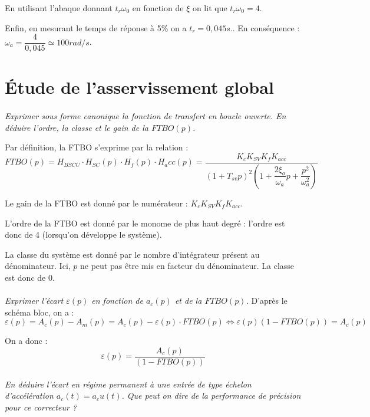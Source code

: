 \documentclass[10pt,oneside]{article}
\begin{document}
En utilisant l'abaque donnant $t_r \omega_0$ en fonction de $\xi$ on lit que 
$t_r \omega_0 = 4$. 

Enfin, en mesurant le temps de réponse à 5\% on a $t_r = 0,045 s.$. En
conséquence : $\omega_a = \dfrac{4}{0,045}\simeq 100 rad/s$.

\section{Étude de l'asservissement global}

\paragraph{}
\textit{Exprimer sous forme canonique la fonction de transfert en boucle ouverte. En déduire
l’ordre, la classe et le gain de la $FTBO(p)$.}

Par définition, la FTBO s'exprime par la relation :
$$
FTBO(p)=H_{BSCU} \cdot H_{SC}(p) \cdot H_f(p) \cdot H_acc(p) =
\dfrac{K_cK_{SV}K_fK_{acc}}{\left( 1+T_{sv}p
\right)^2\left(1+\dfrac{2\xi_a}{\omega_a}p+\dfrac{p^2}{\omega_a^2}\right)}
$$

Le gain de la FTBO est donné par le numérateur : $K_cK_{SV}K_fK_{acc}$. 

L'ordre de la FTBO est donné par le monome de plus haut degré : l'ordre est
donc de 4 (lorsqu'on développe le système).

La classe du système est donné par le nombre d'intégrateur présent au
dénominateur. Ici, $p$ ne peut pas être mis en facteur du dénominateur. La
classe est donc de 0.

\paragraph{}
\textit{Exprimer l'écart $\varepsilon(p)$ en fonction de $a_c(p)$ et de la $FTBO(p)$.}
D'après le schéma bloc, on a : 
$$
\varepsilon(p) = A_c(p)-A_m(p) =A_c(p)-\varepsilon(p)\cdot FTBO(p)
\Leftrightarrow
\varepsilon(p) \left( 1-FTBO(p)\right) = A_c(p)
$$

On a donc :
$$
\varepsilon(p)  = \dfrac{A_c(p)}{\left( 1-FTBO(p)\right)}
$$

\paragraph{}
\textit{En déduire l'écart en régime permanent à une entrée de type échelon d'accélération
$a_c (t)=a_cu (t)$. Que peut on dire de la performance de précision pour ce correcteur ?}
\end{document}
